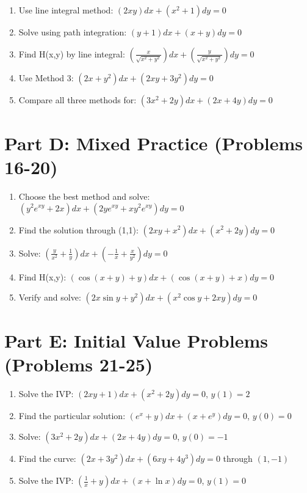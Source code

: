 \documentclass[12pt]{article}
\begin{document}
\begin{enumerate}[start=11]
\item Use line integral method: $(2xy)dx + (x^2 + 1)dy = 0$

\item Solve using path integration: $(y + 1)dx + (x + y)dy = 0$

\item Find H(x,y) by line integral: $\left(\frac{x}{\sqrt{x^2+y^2}}\right)dx + \left(\frac{y}{\sqrt{x^2+y^2}}\right)dy = 0$

\item Use Method 3: $(2x + y^2)dx + (2xy + 3y^2)dy = 0$

\item Compare all three methods for: $(3x^2 + 2y)dx + (2x + 4y)dy = 0$
\end{enumerate}

\section*{Part D: Mixed Practice (Problems 16-20)}

\begin{enumerate}[start=16]
\item Choose the best method and solve: $(y^2 e^{xy} + 2x)dx + (2ye^{xy} + xy^2e^{xy})dy = 0$

\item Find the solution through (1,1): $(2xy + x^2)dx + (x^2 + 2y)dy = 0$

\item Solve: $\left(\frac{y}{x^2} + \frac{1}{y}\right)dx + \left(-\frac{1}{x} + \frac{x}{y^2}\right)dy = 0$

\item Find H(x,y): $(\cos(x+y) + y)dx + (\cos(x+y) + x)dy = 0$

\item Verify and solve: $(2x\sin y + y^2)dx + (x^2\cos y + 2xy)dy = 0$
\end{enumerate}

\section*{Part E: Initial Value Problems (Problems 21-25)}

\begin{enumerate}[start=21]
\item Solve the IVP: $(2xy + 1)dx + (x^2 + 2y)dy = 0$, $y(1) = 2$

\item Find the particular solution: $(e^x + y)dx + (x + e^y)dy = 0$, $y(0) = 0$

\item Solve: $(3x^2 + 2y)dx + (2x + 4y)dy = 0$, $y(0) = -1$

\item Find the curve: $(2x + 3y^2)dx + (6xy + 4y^3)dy = 0$ through $(1,-1)$

\item Solve the IVP: $\left(\frac{1}{x} + y\right)dx + (x + \ln x)dy = 0$, $y(1) = 0$
\end{enumerate}
\end{document}
